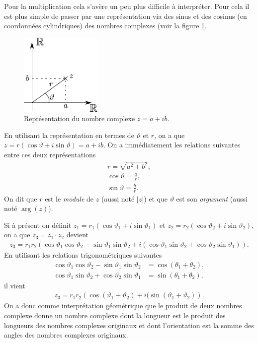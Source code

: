 \documentclass[a4paper,12pt]{book}
\begin{document}
Pour la multiplication cela s'avère un peu plus difficile à interpréter. Pour cela
il est plus simple de passer par une représentation via des sinus et des cosinus (en coordonnées cylindriques)
des nombres complexes (voir la figure \ref{fig_complexPlaneCyl}.
\begin{figure}[htp]
\begin{center}
\includegraphics[width=0.35\textwidth]{figs/complexPlaneCyl.pdf}
\end{center}
\caption{Représentation du nombre complexe $z=a+ib$.}\label{fig_complexPlaneCyl}
\end{figure}

En utilisant la représentation en termes de $\vartheta$ et $r$, on a que $z=r(\cos\vartheta+i\sin\vartheta)=a+ib$.
On a immédiatement les relations suivantes entre ces deux représentations
\begin{align}
 r=\sqrt{a^2+b^2},\\
 \cos\vartheta=\frac{a}{r},\\
 \sin\vartheta=\frac{b}{r}.
\end{align}
On dit que $r$ est le \textit{module} de $z$ (aussi noté $|z|$) et que $\vartheta$ est son \textit{argument} (aussi noté $\arg(z)$).

Si à présent on définit $z_1=r_1(\cos\vartheta_1+i\sin\vartheta_1)$ et $z_2=r_2(\cos\vartheta_2+i\sin\vartheta_2)$, on a que $z_3=z_1\cdot z_2$
devient
\begin{align}
 z_3=r_1r_2\left(\cos\vartheta_1\cos\vartheta_2-\sin\vartheta_1\sin\vartheta_2+i\left(\cos\vartheta_1\sin\vartheta_2+\cos\vartheta_2\sin\vartheta_1\right)\right).
\end{align}
En utilisant les relations trigonométriques suivantes
\begin{align}
 \cos\vartheta_1\cos\vartheta_2-\sin\vartheta_1\sin\vartheta_2&=\cos(\theta_1+\theta_2),\\
 \cos\vartheta_1\sin\vartheta_2+\cos\vartheta_2\sin\vartheta_1&=\sin(\theta_1+\theta_2),
\end{align}
il vient
\begin{align}
 z_3=r_1r_2\left(\cos(\vartheta_1+\vartheta_2)+i(\sin(\vartheta_1+\vartheta_2)\right).
\end{align}
On a donc comme interprétation géométrique que le produit de deux nombres complexe donne un nombre complexe dont 
la longueur est le produit des longueurs des nombres complexes originaux et dont l'orientation est la somme des angles des nombres complexes
originaux.
\end{document}
